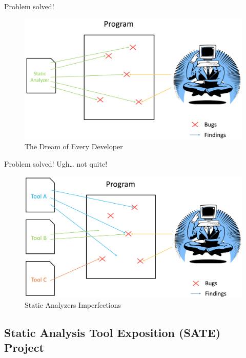 \documentclass[aspectratio=169]{beamer}
\begin{document}
  \begin{frame}{Problem solved!}
    \begin{figure}
      \centering
      \includegraphics[scale=0.3]{figures/the-dream}
      \caption{The Dream of Every Developer}
    \end{figure}
  \end{frame}

  \begin{frame}{Problem solved! Ugh\ldots{} not quite!}
    \begin{figure}
      \centering
      \includegraphics[scale=0.3]{figures/static-analyzers}
      \caption{Static Analyzers Imperfections}
    \end{figure}
  \end{frame}
    
  \subsection{Static Analysis Tool Exposition (SATE) Project}
\end{document}
